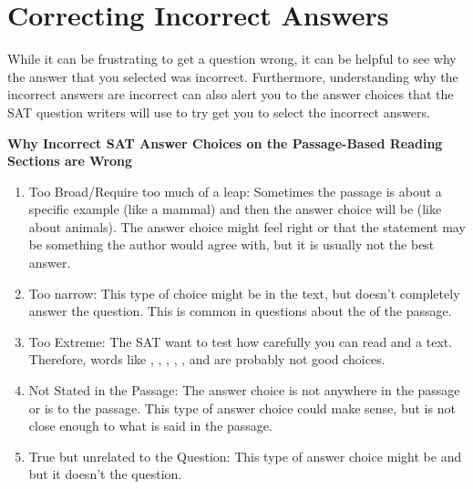\section{Correcting Incorrect Answers}

While it can be frustrating to get a question wrong, it can be helpful to see why the answer that you selected was incorrect. Furthermore, understanding why the incorrect answers are incorrect can also alert you to the answer choices that the SAT question writers will use to try get you to select the incorrect answers.

\bigskip
\textbf{Why Incorrect SAT Answer Choices on the Passage-Based Reading Sections are Wrong}

\begin{enumerate}
\item\sloppy Too Broad/Require too much of a leap: Sometimes the passage is about a specific
example (like a mammal) and then the answer choice will be \shortline
(like about animals). The answer choice might feel right or that the statement may be
something the author would agree with, but it is usually not the best answer.

\item\sloppy Too narrow: This type of choice might be in the text, but \shortline
doesn't completely answer the question. This is common in questions about the \shortline
of the passage.

\item Too Extreme: The SAT want to test how carefully you can read and
a text. Therefore, words like \shortline, \shortline, \shortline, \shortline, \shortline, and \shortline are probably not good choices.

\item Not Stated in the Passage: The answer choice is not \shortline anywhere in the passage or is \shortline to the passage. This type of answer choice could make sense, but is not close enough to what is said in the passage.

\item True but unrelated to the Question: This type of answer choice might be \shortline
and \shortline but it doesn't \shortline the question.
\end{enumerate}

